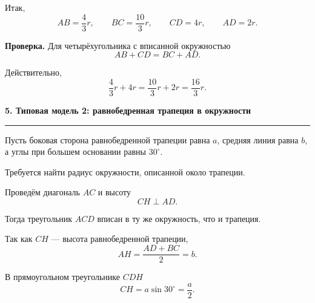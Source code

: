 \documentclass[a4paper,12pt]{article}
\newcommand{\Section}[1]{%
    \vspace{0.4em}%
    {\Large\bfseries\color{darkaccent}#1}\par
    \vspace{0.25em}
    \noindent
    \textcolor{linegray}{\rule{\linewidth}{0.6pt}}
    \vspace{0.5em}%
}
\begin{document}
Итак,
\[
\boxed{
AB=\frac43r,
\qquad
BC=\frac{10}{3}r,
\qquad
CD=4r,
\qquad
AD=2r
}.
\]

\textbf{Проверка.}
Для четырёхугольника с вписанной окружностью
\[
AB+CD=BC+AD.
\]

Действительно,
\[
\frac43r+4r
=
\frac{10}{3}r+2r
=
\frac{16}{3}r.
\]

\clearpage

\Section{5. Типовая модель 2: равнобедренная трапеция в окружности}

Пусть боковая сторона равнобедренной трапеции
равна $a$,
средняя линия равна $b$,
а углы при большем основании
равны $30^\circ$.

Требуется найти радиус окружности,
описанной около трапеции.

Проведём диагональ $AC$
и высоту
\[
CH\perp AD.
\]

Тогда треугольник $ACD$
вписан в ту же окружность,
что и трапеция.

\begin{center}


\end{center}

Так как $CH$ --- высота равнобедренной трапеции,
\[
AH
=
\frac{AD+BC}{2}
=
b.
\]

В прямоугольном треугольнике $CDH$
\[
CH
=
a\sin30^\circ
=
\frac a2.
\]
\end{document}
